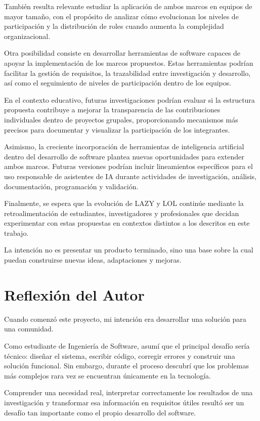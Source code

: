 \documentclass[14pt,a4paper,oneside]{extbook}
\begin{document}
También resulta relevante estudiar la aplicación de ambos marcos en equipos de mayor tamaño, con el propósito de analizar cómo evolucionan los niveles de participación y la distribución de roles cuando aumenta la complejidad organizacional.

Otra posibilidad consiste en desarrollar herramientas de software capaces de apoyar la implementación de los marcos propuestos. Estas herramientas podrían facilitar la gestión de requisitos, la trazabilidad entre investigación y desarrollo, así como el seguimiento de niveles de participación dentro de los equipos.

En el contexto educativo, futuras investigaciones podrían evaluar si la estructura propuesta contribuye a mejorar la transparencia de las contribuciones individuales dentro de proyectos grupales, proporcionando mecanismos más precisos para documentar y visualizar la participación de los integrantes.

Asimismo, la creciente incorporación de herramientas de inteligencia artificial dentro del desarrollo de software plantea nuevas oportunidades para extender ambos marcos. Futuras versiones podrían incluir lineamientos específicos para el uso responsable de asistentes de IA durante actividades de investigación, análisis, documentación, programación y validación.

Finalmente, se espera que la evolución de LAZY y LOL continúe mediante la retroalimentación de estudiantes, investigadores y profesionales que decidan experimentar con estas propuestas en contextos distintos a los descritos en este trabajo.

La intención no es presentar un producto terminado, sino una base sobre la cual puedan construirse nuevas ideas, adaptaciones y mejoras.



\chapter{Reflexión del Autor}

Cuando comenzó este proyecto, mi intención era desarrollar una solución para una comunidad.

Como estudiante de Ingeniería de Software, asumí que el principal desafío sería técnico: diseñar el sistema, escribir código, corregir errores y construir una solución funcional. Sin embargo, durante el proceso descubrí que los problemas más complejos rara vez se encuentran únicamente en la tecnología.

Comprender una necesidad real, interpretar correctamente los resultados de una investigación y transformar esa información en requisitos útiles resultó ser un desafío tan importante como el propio desarrollo del software.
\end{document}

